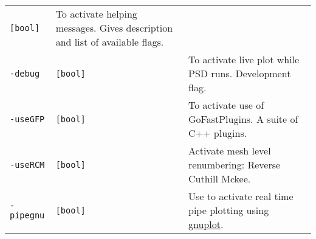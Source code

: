 \begin{longtable}[]{@{}lll@{}}
\begin{minipage}[t]{0.09\columnwidth}
\lstinline![bool]!\strut
\end{minipage} & \begin{minipage}[t]{0.56\columnwidth}\raggedright\strut
To activate helping messages. Gives description and list of available
flags.\strut
\end{minipage}\tabularnewline
\begin{minipage}[t]{0.26\columnwidth}\raggedright\strut
\lstinline!-debug!\strut
\end{minipage} & \begin{minipage}[t]{0.09\columnwidth}\raggedright\strut
\lstinline![bool]!\strut
\end{minipage} & \begin{minipage}[t]{0.56\columnwidth}\raggedright\strut
To activate live plot while PSD runs. Development flag.\strut
\end{minipage}\tabularnewline
\begin{minipage}[t]{0.26\columnwidth}\raggedright\strut
\lstinline!-useGFP!\strut
\end{minipage} & \begin{minipage}[t]{0.09\columnwidth}\raggedright\strut
\lstinline![bool]!\strut
\end{minipage} & \begin{minipage}[t]{0.56\columnwidth}\raggedright\strut
To activate use of GoFastPlugins. A suite of C++ plugins.\strut
\end{minipage}\tabularnewline
\begin{minipage}[t]{0.26\columnwidth}\raggedright\strut
\lstinline!-useRCM!\strut
\end{minipage} & \begin{minipage}[t]{0.09\columnwidth}\raggedright\strut
\lstinline![bool]!\strut
\end{minipage} & \begin{minipage}[t]{0.56\columnwidth}\raggedright\strut
Activate mesh level renumbering: Reverse Cuthill Mckee.\strut
\end{minipage}\tabularnewline
\begin{minipage}[t]{0.26\columnwidth}\raggedright\strut
\lstinline!-pipegnu!\strut
\end{minipage} & \begin{minipage}[t]{0.09\columnwidth}\raggedright\strut
\lstinline![bool]!\strut
\end{minipage} & \begin{minipage}[t]{0.56\columnwidth}\raggedright\strut
Use to activate real time pipe plotting using
\href{http://www.gnuplot.info/}{gnuplot}.\strut

\end{minipage}
\end{longtable}
